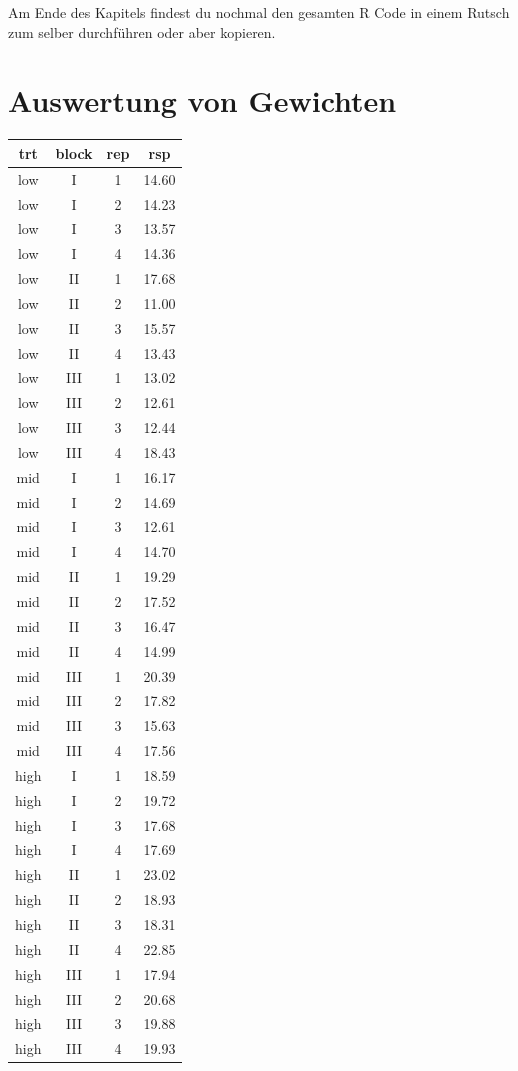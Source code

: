 \documentclass[
  letterpaper,
]{scrbook}
\begin{document}
Am Ende des Kapitels findest du nochmal den gesamten R Code in einem
Rutsch zum selber durchführen oder aber kopieren.

\hypertarget{auswertung-von-gewichten}{%
\section{Auswertung von Gewichten}\label{auswertung-von-gewichten}}

\begin{longtable}[]{@{}cccc@{}}
\toprule()
trt & block & rep & rsp \\
\midrule()
\endhead
low & I & 1 & 14.60 \\
low & I & 2 & 14.23 \\
low & I & 3 & 13.57 \\
low & I & 4 & 14.36 \\
low & II & 1 & 17.68 \\
low & II & 2 & 11.00 \\
low & II & 3 & 15.57 \\
low & II & 4 & 13.43 \\
low & III & 1 & 13.02 \\
low & III & 2 & 12.61 \\
low & III & 3 & 12.44 \\
low & III & 4 & 18.43 \\
mid & I & 1 & 16.17 \\
mid & I & 2 & 14.69 \\
mid & I & 3 & 12.61 \\
mid & I & 4 & 14.70 \\
mid & II & 1 & 19.29 \\
mid & II & 2 & 17.52 \\
mid & II & 3 & 16.47 \\
mid & II & 4 & 14.99 \\
mid & III & 1 & 20.39 \\
mid & III & 2 & 17.82 \\
mid & III & 3 & 15.63 \\
mid & III & 4 & 17.56 \\
high & I & 1 & 18.59 \\
high & I & 2 & 19.72 \\
high & I & 3 & 17.68 \\
high & I & 4 & 17.69 \\
high & II & 1 & 23.02 \\
high & II & 2 & 18.93 \\
high & II & 3 & 18.31 \\
high & II & 4 & 22.85 \\
high & III & 1 & 17.94 \\
high & III & 2 & 20.68 \\
high & III & 3 & 19.88 \\
high & III & 4 & 19.93 \\
\bottomrule()
\end{longtable}
\end{document}
